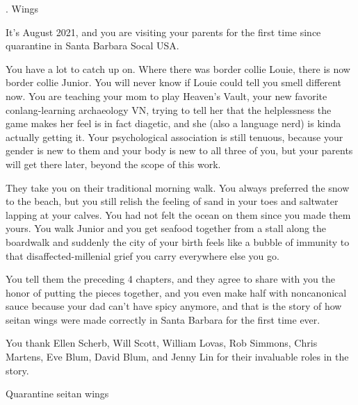 \documentclass[12pt]{article}
\newcommand\chapter[2]{{\thispagestyle{empty} \Large \sc #1. \quad #2

\vspace{1.5em}}}
\begin{document}
\newpage \thispagestyle{empty}

\chapter{5}{Wings}

It's August 2021, and you are visiting your parents for the first time since quarantine in Santa Barbara Socal USA.

You have a lot to catch up on.
Where there was border collie Louie, there is now border collie Junior.
You will never know if Louie could tell you smell different now.
You are teaching your mom to play Heaven's Vault,
your new favorite conlang-learning archaeology VN,
trying to tell her that the helplessness the game makes her feel is in fact diagetic,
and she (also a language nerd) is kinda actually getting it.
%
Your psychological association is still tenuous,
because your gender is new to them and your body is new to all three of you,
but your parents will get there later, beyond the scope of this work.

They take you on their traditional morning walk. %
You always preferred the snow to the beach,
but you still relish the feeling of sand in your toes and saltwater lapping at your calves.
You had not felt the ocean on them since you made them yours.
You walk Junior and you get seafood together from a stall along the boardwalk
and suddenly the city of your birth feels like a bubble of immunity to that disaffected-millenial grief you carry everywhere else you go.

You tell them the preceding 4 chapters,
and they agree to share with you the honor of putting the pieces together,
and you even make half with noncanonical sauce because your dad can't have spicy anymore,
and that is the story of how seitan wings were made correctly in Santa Barbara for the first time ever.

\vspace{14em}

\noindent You thank Ellen Scherb, Will Scott, William Lovas, Rob Simmons, Chris Martens, Eve Blum, David Blum, and Jenny Lin for their invaluable roles in the story.

\newpage \thispagestyle{empty}

\begin{center}
	{\sc \large Quarantine seitan wings}
\end{center}
\end{document}

